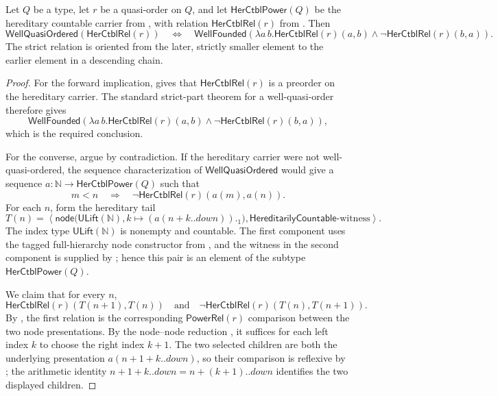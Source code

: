 \begin{helper}
Let $Q$ be a type, let $r$ be a quasi-order on $Q$, and let
$\mathsf{HerCtblPower}(Q)$ be the hereditary countable carrier from
, with relation $\mathsf{HerCtblRel}(r)$ from
.  Then
\[
\mathsf{WellQuasiOrdered}(\mathsf{HerCtblRel}(r))
\quad\Longleftrightarrow\quad
\mathsf{WellFounded}\!\left(\lambda a\,b.
  \mathsf{HerCtblRel}(r)(a,b)\mathbin{\wedge}
  \neg\mathsf{HerCtblRel}(r)(b,a)\right).
\]
The strict relation is oriented from the later, strictly smaller element to
the earlier element in a descending chain.
\end{helper}
\begin{proof}
For the forward implication,  gives that
$\mathsf{HerCtblRel}(r)$ is a preorder on the hereditary carrier.  The
standard strict-part theorem for a well-quasi-order therefore gives
\[
\mathsf{WellFounded}\!\left(\lambda a\,b.
  \mathsf{HerCtblRel}(r)(a,b)\mathbin{\wedge}
  \neg\mathsf{HerCtblRel}(r)(b,a)\right),
\]
which is the required conclusion.

For the converse, argue by contradiction.  If the hereditary carrier were
not well-quasi-ordered, the sequence characterization of
$\mathsf{WellQuasiOrdered}$ would give a sequence
$a:\mathbb N\to\mathsf{HerCtblPower}(Q)$ such that
\[
 m<n\quad\Longrightarrow\quad
 \neg\mathsf{HerCtblRel}(r)(a(m),a(n)).
\]
For each $n$, form the hereditary tail
\[
 T(n)=\left\langle
   \mathsf{node}\bigl(\mathsf{ULift}(\mathbb N),
      k\mapsto (a(n+k.\mathord{.down}))._1\bigr),
   \mathsf{HereditarilyCountable}\text{-witness}
 \right\rangle.
\]
The index type $\mathsf{ULift}(\mathbb N)$ is nonempty and countable.  The
first component uses the tagged full-hierarchy node constructor from
, and the witness in the second component is supplied by
; hence this pair is an element of the subtype
$\mathsf{HerCtblPower}(Q)$.

We claim that for every $n$,
\[
 \mathsf{HerCtblRel}(r)(T(n+1),T(n))
 \quad\text{and}\quad
 \neg\mathsf{HerCtblRel}(r)(T(n),T(n+1)).
\]
By , the first relation is the corresponding
$\mathsf{PowerRel}(r)$ comparison between the two node presentations.  By
the node--node reduction , it suffices for each
left index $k$ to choose the right index $k+1$.  The two selected children
are both the underlying presentation $a(n+1+k.\mathord{.down})$, so their
comparison is reflexive by ; the arithmetic identity
$n+1+k.\mathord{.down}=n+(k+1).\mathord{.down}$ identifies the two displayed
children.


\end{proof}
